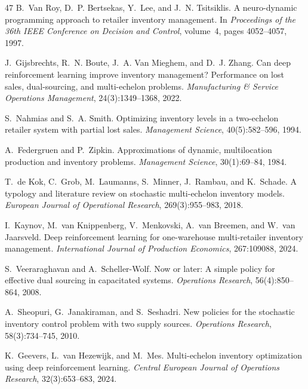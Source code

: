 \documentclass[11pt]{article}
\begin{document}
\begin{thebibliography}{47}
B.~Van Roy, D.~P. Bertsekas, Y.~Lee, and J.~N. Tsitsiklis.
A neuro-dynamic programming approach to retailer inventory management.
In \emph{Proceedings of the 36th IEEE Conference on Decision and Control}, volume~4, pages 4052--4057, 1997.

J.~Gijsbrechts, R.~N. Boute, J.~A. Van Mieghem, and D.~J. Zhang.
Can deep reinforcement learning improve inventory management? Performance on lost sales, dual-sourcing, and multi-echelon problems.
\emph{Manufacturing \& Service Operations Management}, 24(3):1349--1368, 2022.

S.~Nahmias and S.~A. Smith.
Optimizing inventory levels in a two-echelon retailer system with partial lost sales.
\emph{Management Science}, 40(5):582--596, 1994.

A.~Federgruen and P.~Zipkin.
Approximations of dynamic, multilocation production and inventory problems.
\emph{Management Science}, 30(1):69--84, 1984.

T.~de Kok, C.~Grob, M.~Laumanns, S.~Minner, J.~Rambau, and K.~Schade.
A typology and literature review on stochastic multi-echelon inventory models.
\emph{European Journal of Operational Research}, 269(3):955--983, 2018.

I.~Kaynov, M.~van Knippenberg, V.~Menkovski, A.~van Breemen, and W.~van Jaarsveld.
Deep reinforcement learning for one-warehouse multi-retailer inventory management.
\emph{International Journal of Production Economics}, 267:109088, 2024.

S.~Veeraraghavan and A.~Scheller-Wolf.
Now or later: A simple policy for effective dual sourcing in capacitated systems.
\emph{Operations Research}, 56(4):850--864, 2008.

A.~Sheopuri, G.~Janakiraman, and S.~Seshadri.
New policies for the stochastic inventory control problem with two supply sources.
\emph{Operations Research}, 58(3):734--745, 2010.

K.~Geevers, L.~van Hezewijk, and M.~Mes.
Multi-echelon inventory optimization using deep reinforcement learning.
\emph{Central European Journal of Operations Research}, 32(3):653--683, 2024.


\end{thebibliography}
\end{document}
